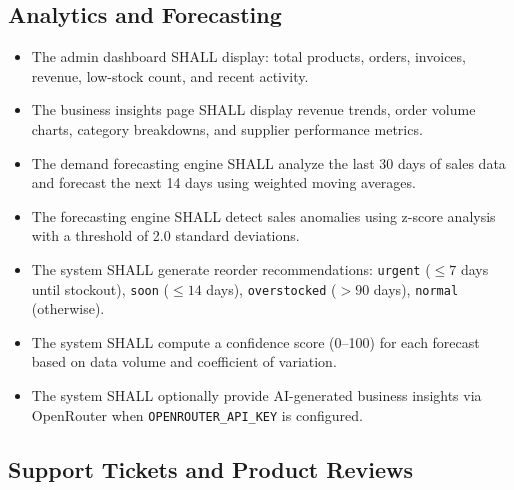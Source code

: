 \documentclass[12pt,a4paper]{report}
\begin{document}
\subsection{Analytics and Forecasting}

\begin{tcolorbox}[reqbox,title={FR-ANALYTICS: Analytics Requirements}]
\begin{itemize}[leftmargin=1.5em]
  \item {} The admin dashboard SHALL display: total products, orders, invoices, revenue, low-stock count, and recent activity.
  \item {} The business insights page SHALL display revenue trends, order volume charts, category breakdowns, and supplier performance metrics.
  \item {} The demand forecasting engine SHALL analyze the last 30 days of sales data and forecast the next 14 days using weighted moving averages.
  \item {} The forecasting engine SHALL detect sales anomalies using z-score analysis with a threshold of 2.0 standard deviations.
  \item {} The system SHALL generate reorder recommendations: \texttt{urgent} ($\leq 7$ days until stockout), \texttt{soon} ($\leq 14$ days), \texttt{overstocked} ($> 90$ days), \texttt{normal} (otherwise).
  \item {} The system SHALL compute a confidence score (0--100) for each forecast based on data volume and coefficient of variation.
  \item {} The system SHALL optionally provide AI-generated business insights via OpenRouter when \texttt{OPENROUTER\_API\_KEY} is configured.
\end{itemize}
\end{tcolorbox}

\subsection{Support Tickets and Product Reviews}
\end{document}
